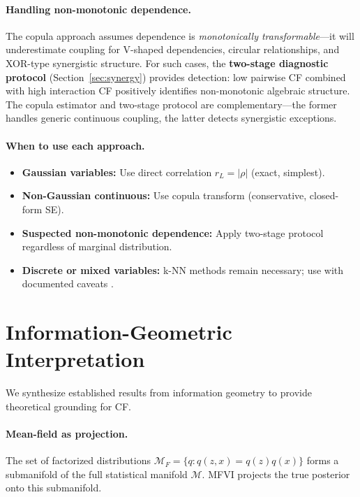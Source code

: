 \documentclass[10pt]{article} %
\theoremstyle{plain}
\theoremstyle{definition}
\begin{document}
\paragraph{Handling non-monotonic dependence.} The copula approach assumes dependence is \emph{monotonically transformable}---it will underestimate coupling for V-shaped dependencies, circular relationships, and XOR-type synergistic structure. For such cases, the \textbf{two-stage diagnostic protocol} (Section~\ref{sec:synergy}) provides detection: low pairwise CF combined with high interaction CF positively identifies non-monotonic algebraic structure. The copula estimator and two-stage protocol are complementary---the former handles generic continuous coupling, the latter detects synergistic exceptions.

\paragraph{When to use each approach.}
\begin{itemize}[nosep]
    \item \textbf{Gaussian variables:} Use direct correlation $r_L = |\rho|$ (exact, simplest).
    \item \textbf{Non-Gaussian continuous:} Use copula transform (conservative, closed-form SE).
    \item \textbf{Suspected non-monotonic dependence:} Apply two-stage protocol regardless of marginal distribution.
    \item \textbf{Discrete or mixed variables:} k-NN methods remain necessary; use with documented caveats \citep{vandenberg2025linfoot}.
\end{itemize}


\section{Information-Geometric Interpretation}
\label{sec:geometry}

We synthesize established results from information geometry \citep{amari2016information} to provide theoretical grounding for CF.

\paragraph{Mean-field as projection.} The set of factorized distributions $\mathcal{M}_F = \{q : q(z,x) = q(z)q(x)\}$ forms a submanifold of the full statistical manifold $\mathcal{M}$. MFVI projects the true posterior onto this submanifold.
\end{document}
